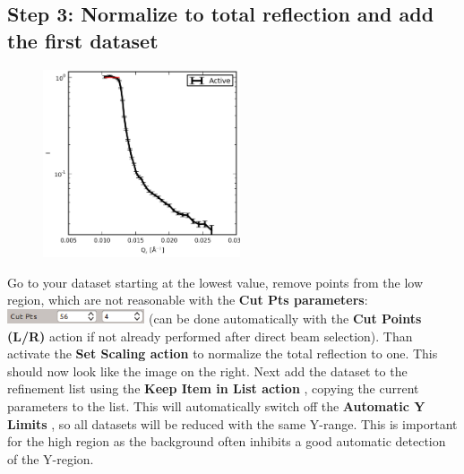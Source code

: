   \subsection{Step 3: Normalize to total reflection and add the first dataset}
    \begin{figure}
     \includegraphics[width=165pt]{screenshots/totalreflection.png} 
    \end{figure}
    Go to your dataset starting at the lowest \Qz value, remove points from the low \Qz region, which are not reasonable with the \textbf{Cut Pts parameters}:
    \includegraphics[width=115pt]{screenshots/cutpoints.png} (can be done automatically with the \textbf{Cut Points (L/R)}  action if not already performed after direct beam selection). Than activate the \textbf{Set Scaling action}  to normalize the total reflection to one.
    This should now look like the image on the right.
    Next add the dataset to the refinement list using the \textbf{Keep Item in List action} , copying the current parameters to the list.
    This will automatically switch off the \textbf{Automatic Y Limits} , so all datasets will be reduced with the same Y-range.
    This is important for the high \Qz region as the background often inhibits a good automatic detection of the Y-region.
    
  
